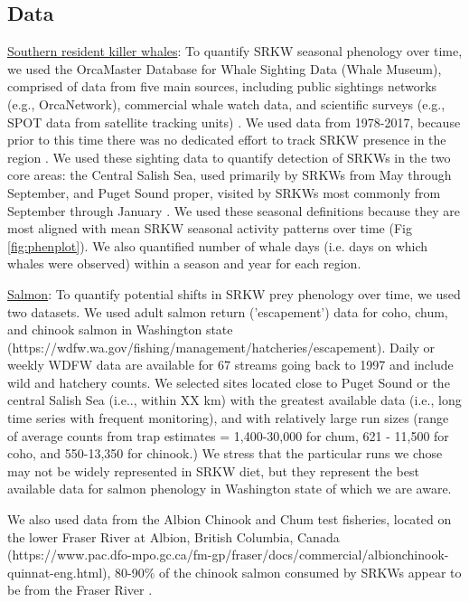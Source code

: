 \documentclass{article}
\begin{document}
\subsection* {Data}
\par \underline{Southern resident killer whales}: To quantify SRKW seasonal phenology over time, we used the OrcaMaster Database for Whale Sighting Data (Whale Museum), comprised of data from five main sources, including public sightings networks (e.g., OrcaNetwork), commercial whale watch data, and scientific surveys (e.g., SPOT data from satellite tracking units) \citep{olson2018}. We used data from 1978-2017, because prior to this time there was no dedicated effort to track SRKW presence in the region \citep{olson2018}. We used these sighting data to quantify %
detection of SRKWs in the two core areas: the Central Salish Sea, used primarily by SRKWs from May through September, and Puget Sound proper, visited by SRKWs most commonly from September through January \citep{olson2018}. We used these seasonal definitions because they are most aligned with mean SRKW seasonal activity patterns over time (Fig \ref{fig:phenplot}).  We also quantified number of whale days (i.e. days on which whales were observed) within a season and year for each region. 

\par \underline{Salmon}: To quantify potential shifts in SRKW prey phenology over time, we used two datasets. We used adult salmon return ('escapement') data for coho, chum, and chinook salmon in Washington state (https://wdfw.wa.gov/fishing/management/hatcheries/escapement). Daily or weekly WDFW data are available for 67 streams going back to 1997 and include wild and hatchery counts. We selected sites located close to Puget Sound or the central Salish Sea (i.e.., within XX km) with the greatest available data (i.e., long time series with frequent monitoring), and with relatively large run sizes (range of average counts from trap estimates = 1,400-30,000 for chum, 621 - 11,500 for coho, and 550-13,350 for chinook.) We stress that the particular runs we chose may not be widely represented in SRKW diet, but they represent the best available data for salmon phenology in Washington state of which we are aware. 

\par We also used data from the Albion Chinook and Chum test fisheries, located  on the lower Fraser River at Albion, British Columbia, Canada (https://www.pac.dfo-mpo.gc.ca/fm-gp/fraser/docs/commercial/albionchinook-quinnat-eng.html), 80-90\% of the chinook salmon consumed by SRKWs appear to be from the Fraser River \citep{hanson2010}.
\end{document}
